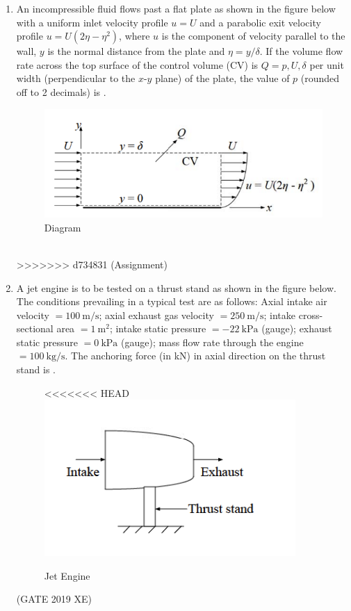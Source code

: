 \documentclass[journal,12pt,onecolumn]{IEEEtran}
\begin{document}
\begin{enumerate}
\vspace{0.5cm}

\item An incompressible fluid flows past a flat plate as shown in the figure below with a uniform inlet velocity profile $u=U$ and a parabolic exit velocity profile $u=U(2\eta - \eta^2)$, where $u$ is the component of velocity parallel to the wall, $y$ is the normal distance from the plate and $\eta=y/\delta$. If the volume flow rate across the top surface of the control volume (CV) is $Q=p,U,\delta$ per unit width (perpendicular to the $x$-$y$ plane) of the plate, the value of $p$ (rounded off to 2 decimals) is \underline{\hspace{2cm}}.

\begin{figure}[htbp]
  \centering
  \includegraphics[width=.7\linewidth]{figs/B/fig4.png}
  \caption{Diagram}
  \label{B/fig4}
\end{figure}
\hfill{} \\

\newpage
>>>>>>> d734831 (Assignment)

\item A jet engine is to be tested on a thrust stand as shown in the figure below. The conditions prevailing in a typical test are as follows: Axial intake air velocity $=100\ \mathrm{m/s}$; axial exhaust gas velocity $=250\ \mathrm{m/s}$; intake cross-sectional area $=1\ \mathrm{m^2}$; intake static pressure $=-22\ \mathrm{kPa}$ (gauge); exhaust static pressure $=0\ \mathrm{kPa}$ (gauge); mass flow rate through the engine $=100\ \mathrm{kg/s}$. The anchoring force (in kN) in axial direction on the thrust stand is \underline{\hspace{2cm}}.

\begin{figure}[htbp]
  \centering
<<<<<<< HEAD
  \includegraphics[width=.75\columnwidth]{figs/B/fig5.png}
  \caption{Jet Engine}
  \label{fig:figs/B/fig5.png}
\end{figure}
\hfill{(GATE 2019 XE)}

\end{enumerate}
\end{document}
